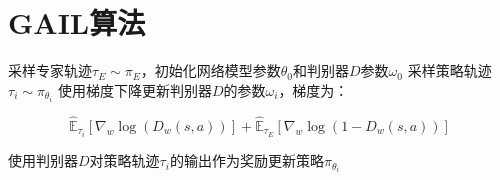 \documentclass[11pt]{ctexart}
\begin{document}
\clearpage


\section{GAIL算法}
\begin{algorithm}[H] %
	\renewcommand{\thealgorithm}{} %
	\caption{} 
	\begin{algorithmic}[1] %
		\STATE 采样专家轨迹$\tau _{E} \sim \pi _{E}$，初始化网络模型参数$\theta _{0}$和判别器$D$参数$\omega _{0}$
			\STATE 采样策略轨迹$\tau_{i} \sim \pi _{\theta _{i}}$
			\STATE 使用梯度下降更新判别器$D$的参数$\omega _{i}$，梯度为：
			\begin{center}
				\begin{equation}
				\hat{\mathbb{E}}_{\tau_{i}}\left[\nabla_{w} \log \left(D_{w}(s, a)\right)\right]+\hat{\mathbb{E}}_{\tau_{E}}\left[\nabla_{w} \log \left(1-D_{w}(s, a)\right)\right]
				\end{equation}
			\end{center}
			\STATE 使用判别器$D$对策略轨迹$\tau_{i}$的输出作为奖励更新策略$\pi _{\theta _{i}}$\footnotemark[2]
		\ENDFOR
	\end{algorithmic}
\end{algorithm}
\clearpage
\end{document}
